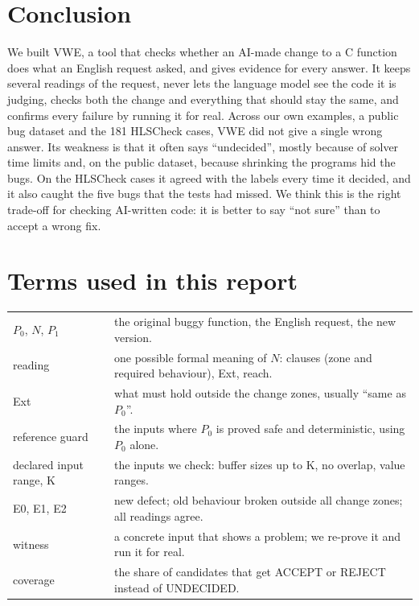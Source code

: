 \documentclass[10pt,a4paper]{article}
\newcommand{\Pz}{P_0}\newcommand{\Po}{P_1}
\begin{document}
\section{Conclusion}
We built VWE, a tool that checks whether an AI-made change to a C function does what an English
request asked, and gives evidence for every answer. It keeps several readings of the request, never
lets the language model see the code it is judging, checks both the change and everything that
should stay the same, and confirms every failure by running it for real. Across our own examples,
a public bug dataset and the 181 HLSCheck cases, VWE did not give a single wrong answer. Its
weakness is that it often says ``undecided'', mostly because of solver time limits and, on the
public dataset, because shrinking the programs hid the bugs. On the HLSCheck cases it agreed with
the labels every time it decided, and it also caught the five bugs that the tests had missed. We think
this is the right trade-off for checking AI-written code: it is better to say ``not sure'' than to
accept a wrong fix.

\section{Terms used in this report}
\noindent\begin{tabularx}{\linewidth}{@{}l>{\raggedright\arraybackslash}X@{}}\toprule
$\Pz$, $N$, $\Po$ & the original buggy function, the English request, the new version.\\
reading & one possible formal meaning of $N$: clauses (zone and required behaviour), Ext, reach.\\
Ext & what must hold outside the change zones, usually ``same as $\Pz$''.\\
reference guard & the inputs where $\Pz$ is proved safe and deterministic, using $\Pz$ alone.\\
declared input range, K & the inputs we check: buffer sizes up to K, no overlap, value ranges.\\
E0, E1, E2 & new defect; old behaviour broken outside all change zones; all readings agree.\\
witness & a concrete input that shows a problem; we re-prove it and run it for real.\\
coverage & the share of candidates that get ACCEPT or REJECT instead of UNDECIDED.\\\bottomrule
\end{tabularx}
\end{document}
